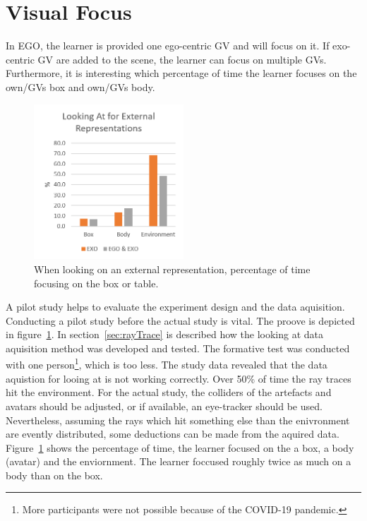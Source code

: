 \section{Visual Focus}
In EGO, the learner is provided one ego-centric GV and will focus on it. If exo-centric GV are added to the scene, the learner can focus on multiple GVs. Furthermore, it is interesting which percentage of time the learner focuses on the own/GVs box and own/GVs body.\\
\begin{figure}[htb]
	\centering
	\includegraphics[width=0.5\textwidth]{figures/lookingAtExternalRepresentations.png}
	\caption[Looking At for external representations.]{When looking on an external representation, percentage of time focusing on the box or table.}
	\label{fig:lookingAtExternal}
\end{figure}
A pilot study helps to evaluate the experiment design and the data aquisition. Conducting a pilot study before the actual study is vital. The proove is depicted in figure~\ref{fig:lookingAtExternal}. In section~\ref{sec:rayTrace} is described how the looking at data aquisition method was developed and tested. The formative test was conducted with one person\footnote{More participants were not possible because of the COVID-19 pandemic.}, which is too less. The study data revealed that the data aquistion for looing at is not working correctly. Over 50\% of time the ray traces hit the environment. For the actual study, the colliders of the artefacts and avatars should be adjusted, or if available, an eye-tracker should be used. Nevertheless, assuming the rays which hit something else than the enivronment are evently distributed, some deductions can be made from the aquired data.\\
Figure~\ref{fig:lookingAtExternal} shows the percentage of time, the learner focused on the a box, a body (avatar) and the enviornment. The learner foccused roughly twice as much on a body than on the box.\\
